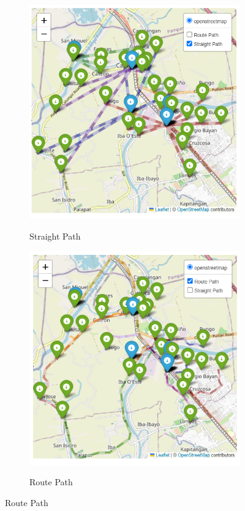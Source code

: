 \documentclass[11pt,letterpaper,]{article}
\begin{document}
	\begin{figure}[H]
		\centering
		\caption{Community to Shelter Paths}
		\begin{subfigure}{0.35\textwidth}
			\caption{Straight Path}
			\centering
			\includegraphics[width=\textwidth]{Chapter 4/straight path}
			\label{straightpath}
		\end{subfigure}
		\hspace{0.5cm}
		\begin{subfigure}{0.35\textwidth}
			\caption{Route Path}
			\centering
			\includegraphics[width=\textwidth]{Chapter 4/route path}
			\label{routepath}
		\end{subfigure}
		
	\end{figure}
	
\end{document}
